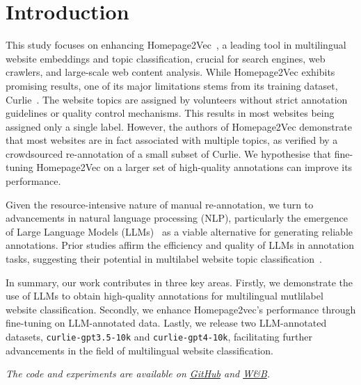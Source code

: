 \section{Introduction}

This study focuses on enhancing Homepage2Vec~\cite{homepage2vec}, a leading tool in multilingual website embeddings and topic classification, crucial for search engines, web crawlers, and large-scale web content analysis. While Homepage2Vec exhibits promising results, one of its major limitations stems from its training dataset, Curlie~\cite{curlie}. The website topics are assigned by volunteers without strict annotation guidelines or quality control mechanisms. This results in most websites being assigned only a single label. However, the authors of Homepage2Vec demonstrate that most websites are in fact associated with multiple topics, as verified by a crowdsourced re-annotation of a small subset of Curlie. We hypothesise that fine-tuning Homepage2Vec on a larger set of high-quality annotations can improve its performance.

Given the resource-intensive nature of manual re-annotation, we turn to advancements in natural language processing (NLP), particularly the emergence of Large Language Models (LLMs)~\cite{gpt3, gpt4} as a viable alternative for generating reliable annotations. Prior studies affirm the efficiency and quality of LLMs in annotation tasks, suggesting their potential in multilabel website topic classification~\cite{is-gpt3-good-annot,prompt-tuning,annollm,reduce-labeling-cost}.

In summary, our work contributes in three key areas. Firstly, we demonstrate the use of LLMs to obtain high-quality annotations for multilingual mutlilabel website classification. Secondly, we enhance Homepage2vec's performance through fine-tuning on LLM-annotated data. Lastly, we release two LLM-annotated datasets, \texttt{curlie-gpt3.5-10k} and \texttt{curlie-gpt4-10k}, facilitating further advancements in the field of multilingual website classification.

\textit{The code and experiments are available on \href{https://github.com/CS-433/ml-project-2-mlp}{GitHub} and \href{https://wandb.ai/ml-project-2-mlp/homepage2vec}{W\&B}.}

